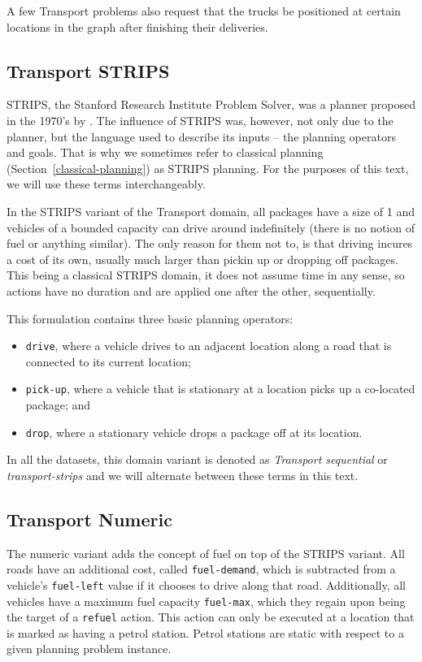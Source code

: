 A few Transport problems also request that the trucks be positioned at certain
locations in the graph
after finishing their deliveries.

\subsection{Transport STRIPS}\label{transport-strips}

STRIPS, the Stanford Research Institute Problem Solver,
was a planner proposed in the 1970's by \citet{Fikes1971}.
The influence of STRIPS was, however, not only due to the planner,
but the language used to describe its inputs -- the planning operators and goals.
That is why we sometimes refer to classical planning (Section~\ref{classical-planning})
as STRIPS planning. For the purposes of this text, we will use these terms interchangeably.

In the STRIPS variant of the Transport domain,
all packages have a size of 1 and vehicles of a bounded capacity can drive around indefinitely
(there is no notion of fuel or anything similar). The only reason for them not to, is that
driving incures a cost of its own, usually much larger than pickin up or dropping off packages.
This being a classical STRIPS domain,
it does not assume time in any sense,
so actions have no duration and are applied one after the other, sequentially.

This formulation contains three basic planning operators:

\begin{itemize}
\item \verb+drive+, where a vehicle drives to an adjacent location
along a road that is connected to its current location;
\item \verb+pick-up+, where a vehicle that is stationary at a location picks up a co-located package; and
\item \verb+drop+, where a stationary vehicle drops a package off at its location.
\end{itemize}

In all the datasets, this domain variant is denoted as \textit{Transport sequential}
or \textit{transport-strips} and we will alternate between these terms in this text.

\subsection{Transport Numeric}\label{transport-numeric}

The numeric variant adds the concept of fuel on top of the STRIPS variant.
All roads have an additional cost, called \verb+fuel-demand+, which is
subtracted from a vehicle's \verb+fuel-left+ value if it chooses to drive along that road.
Additionally, all vehicles have a maximum fuel capacity \verb+fuel-max+,
which they regain upon being the target of a \verb+refuel+ action. This action can only
be executed at a location that is marked as having a petrol station. Petrol stations
are static with respect to a given planning problem instance.

